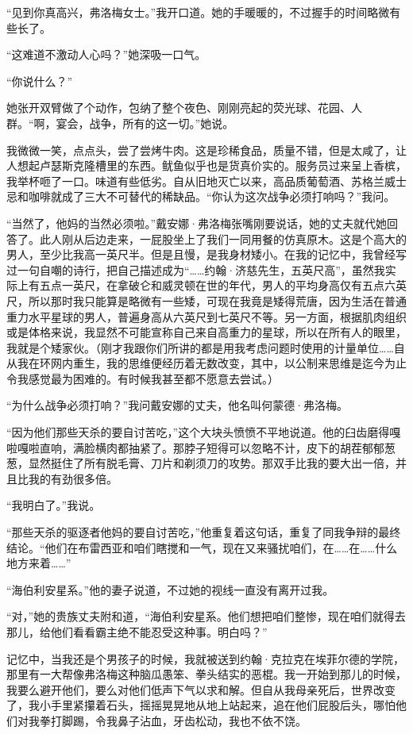 \documentclass[AutoFakeBold=true]{book}
\begin{document}
``见到你真高兴，弗洛梅女士。''我开口道。她的手暖暖的，不过握手的时间略微有些长了。

``这难道不激动人心吗？''她深吸一口气。

``你说什么？''

她张开双臂做了个动作，包纳了整个夜色、刚刚亮起的荧光球、花园、人群。``啊，宴会，战争，{\kaishu 所有的这一切}。''她说。

我微微一笑，点点头，尝了尝烤牛肉。这是珍稀食品，质量不错，但是太咸了，让人想起卢瑟斯克隆槽里的东西。鱿鱼似乎也是货真价实的。服务员过来呈上香槟，我举杯咂了一口。味道有些低劣。自从旧地灭亡以来，高品质葡萄酒、苏格兰威士忌和咖啡就成了三大不可替代的稀缺品。``你认为这次战争必须打响吗？''我问。

``当然了，他妈的当然必须啦。''戴安娜·弗洛梅张嘴刚要说话，她的丈夫就代她回答了。此人刚从后边走来，一屁股坐上了我们一同用餐的仿真原木。这是个高大的男人，至少比我高一英尺半。但是且慢，是我身材矮小。在我的记忆中，我曾经写过一句自嘲的诗行，把自己描述成为``……约翰·济慈先生，五英尺高''，虽然我实际上有五点一英尺，在拿破仑和威灵顿在世的年代，男人的平均身高仅有五点六英尺，所以那时我只能算是略微有一些矮，可现在我竟是矮得荒唐，因为生活在普通重力水平星球的男人，普遍身高从六英尺到七英尺不等。另一方面，根据肌肉组织或是体格来说，我显然不可能宣称自己来自高重力的星球，所以在所有人的眼里，我就是个矮家伙。（刚才我跟你们所讲的都是用我考虑问题时使用的计量单位……自从我在环网内重生，我的思维便经历着无数改变，其中，以公制来思维是迄今为止令我感觉最为困难的。有时候我甚至都不愿意去尝试。）

``为什么战争必须打响？''我问戴安娜的丈夫，他名叫何蒙德·弗洛梅。

``因为他们那些天杀的{\kaishu 要自讨苦吃}，''这个大块头愤愤不平地说道。他的臼齿磨得嘎啦嘎啦直响，满脸横肉都抽紧了。那脖子短得可以忽略不计，皮下的胡茬郁郁葱葱，显然挺住了所有脱毛膏、刀片和剃须刀的攻势。那双手比我的要大出一倍，并且比我的有劲很多倍。

``我明白了。''我说。

``那些天杀的驱逐者他妈的{\kaishu 要自讨苦吃}，''他重复着这句话，重复了同我争辩的最终结论。``他们在布雷西亚和咱们瞎搅和一气，现在又来骚扰咱们，在……在……什么地方来着……''

``海伯利安星系。''他的妻子说道，不过她的视线一直没有离开过我。

``对，''她的贵族丈夫附和道，``海伯利安星系。他们想把咱们整惨，现在咱们就得去那儿，给他们看看霸主绝不能忍受这种事。明白吗？''

记忆中，当我还是个男孩子的时候，我就被送到约翰·克拉克在埃菲尔德的学院，那里有一大帮像弗洛梅这种脑瓜愚笨、拳头结实的恶棍。我一开始到那儿的时候，我要么避开他们，要么对他们低声下气以求和解。但自从我母亲死后，世界改变了，我小手里紧攥着石头，摇摇晃晃地从地上站起来，追在他们屁股后头，哪怕他们对我拳打脚踢，令我鼻子沾血，牙齿松动，我也不依不饶。
\end{document}

